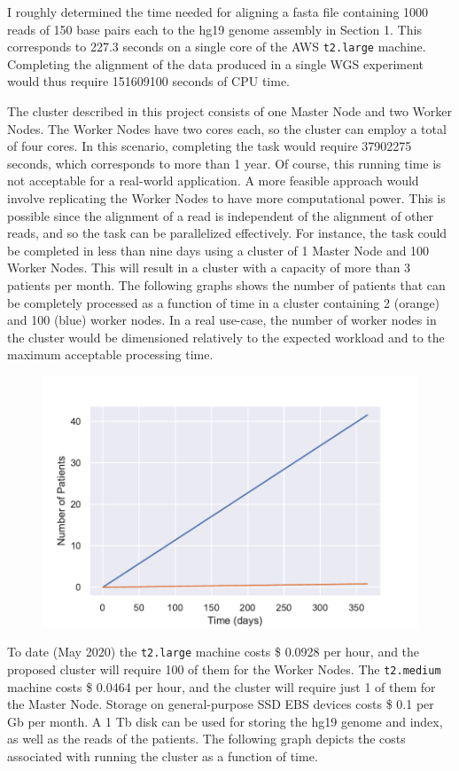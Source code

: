 \documentclass{article}
\begin{document}
I roughly determined the time needed for aligning a fasta file containing 1000 reads of 150 base pairs each to the hg19 genome assembly in Section 1.
This corresponds to 227.3 seconds on a single core of the AWS \texttt{t2.large} machine.
Completing the alignment of the data produced in a single WGS experiment would thus require 151609100 seconds of CPU time.

The cluster described in this project consists of one Master Node and two Worker Nodes.
The Worker Nodes have two cores each, so the cluster can employ a total of four cores.
In this scenario, completing the task would require 37902275 seconds, which corresponds to more than 1 year.
Of course, this running time is not acceptable for a real-world application.
A more feasible approach would involve replicating the Worker Nodes to have more computational power.
This is possible since the alignment of a read is independent of the alignment of other reads, and so the task can be parallelized effectively.
For instance, the task could be completed in less than nine days using a cluster of 1 Master Node and 100 Worker Nodes.
This will result in a cluster with a capacity of more than 3 patients per month.
The following graphs shows the number of patients that can be completely processed as a function of time in a cluster containing 2 (orange) and 100 (blue) worker nodes.
In a real use-case, the number of worker nodes in the cluster would be dimensioned relatively to the expected workload and to the maximum acceptable processing time.

\begin{figure}[!h]
    \center
    \includegraphics[width=.8\textwidth]{./images/patient_graph.pdf}
\end{figure}
\FloatBarrier

To date (May 2020) the \texttt{t2.large} machine costs \$ 0.0928 per hour, and the proposed cluster will require 100 of them for the Worker Nodes.
The \texttt{t2.medium} machine costs \$ 0.0464 per hour, and the cluster will require just 1 of them for the Master Node.
Storage on general-purpose SSD EBS devices costs \$ 0.1 per Gb per month.
A 1 Tb disk can be used for storing the hg19 genome and index, as well as the reads of the patients.
The following graph depicts the costs associated with running the cluster as a function of time.
\end{document}
